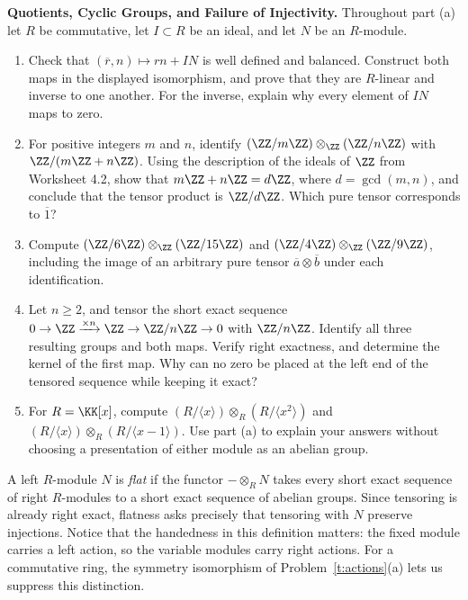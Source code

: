 \documentclass[12pt,reqno]{amsart}
\begin{document}
\begin{problems}
\item\label{t:cyclic} \textbf{Quotients, Cyclic Groups, and Failure of Injectivity.} Throughout part (a) let $R$ be commutative, let $I\subset R$ be an ideal, and let $N$ be an $R$-module.
\begin{enumerate}
\item Check that $(\overline r,n)\mapsto rn+IN$ is well defined and balanced. Construct both maps in the displayed isomorphism, and prove that they are $R$-linear and inverse to one another. For the inverse, explain why every element of $IN$ maps to zero.
\item For positive integers $m$ and $n$, identify $(\ZZ/m\ZZ)\otimes_{\ZZ}(\ZZ/n\ZZ)$ with $\ZZ/(m\ZZ+n\ZZ)$. Using the description of the ideals of $\ZZ$ from Worksheet 4.2, show that $m\ZZ+n\ZZ=d\ZZ$, where $d=\gcd(m,n)$, and conclude that the tensor product is $\ZZ/d\ZZ$. Which pure tensor corresponds to $\overline1$?
\item Compute $(\ZZ/6\ZZ)\otimes_{\ZZ}(\ZZ/15\ZZ)$ and $(\ZZ/4\ZZ)\otimes_{\ZZ}(\ZZ/9\ZZ)$, including the image of an arbitrary pure tensor $\overline a\otimes\overline b$ under each identification.
\item Let $n\geq2$, and tensor the short exact sequence $0\to\ZZ\xrightarrow{\times n}\ZZ\to\ZZ/n\ZZ\to0$ with $\ZZ/n\ZZ$. Identify all three resulting groups and both maps. Verify right exactness, and determine the kernel of the first map. Why can no zero be placed at the left end of the tensored sequence while keeping it exact?
\item For $R=\KK[x]$, compute $(R/\langle x\rangle)\otimes_R(R/\langle x^2\rangle)$ and $(R/\langle x\rangle)\otimes_R(R/\langle x-1\rangle)$. Use part (a) to explain your answers without choosing a presentation of either module as an abelian group.
\end{enumerate}
\end{problems}

\hrulefill

A left $R$-module $N$ is \emph{flat} if the functor $-\otimes_RN$ takes every short exact sequence of right $R$-modules to a short exact sequence of abelian groups. Since tensoring is already right exact, flatness asks precisely that tensoring with $N$ preserve injections. Notice that the handedness in this definition matters: the fixed module carries a left action, so the variable modules carry right actions. For a commutative ring, the symmetry isomorphism of Problem~\ref{t:actions}(a) lets us suppress this distinction.
\end{document}
